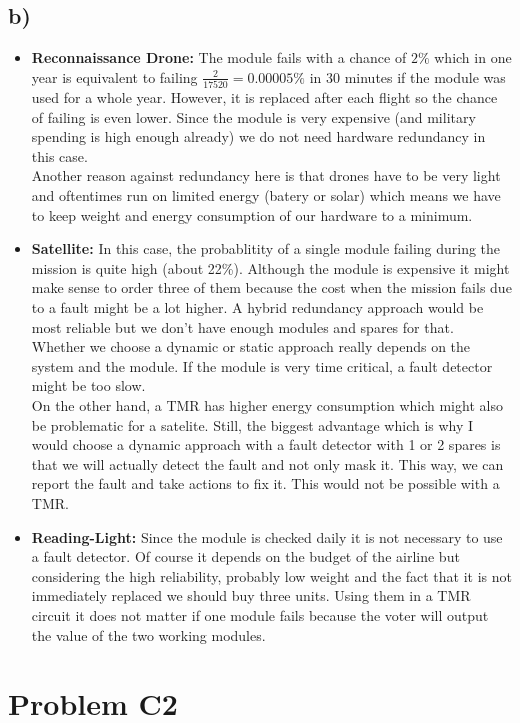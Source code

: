 \documentclass[12pt]{article}
\begin{document}
\subsection*{b)}
\begin{itemize}
\item \textbf{Reconnaissance Drone:} The module fails with a chance of $2\%$ which in one year is equivalent to failing $\frac{2}{17520} = 0.00005\%$ in 30 minutes if the module was used for a whole year. However, it is replaced after each flight so the chance of failing is even lower. Since the module is very expensive (and military spending is high enough already) we do not need hardware redundancy in this case.\\
Another reason against redundancy here is that drones have to be very light and oftentimes run on limited energy (batery or solar) which means we have to keep weight and energy consumption of our hardware to a minimum.
\item \textbf{Satellite:} In this case, the probablitity of a single module failing during the mission is quite high (about 22\%). Although the module is expensive it might make sense to order three of them because the cost when the mission fails due to a fault might be a lot higher. A hybrid redundancy approach would be most reliable but we don't have enough modules and spares for that.\\
Whether we choose a dynamic or static approach really depends on the system and the module. If the module is very time critical, a fault detector might be too slow. \\
On the other hand, a TMR has higher energy consumption which might also be problematic for a satelite. Still, the biggest advantage which is why I would choose a dynamic approach with a fault detector with 1 or 2 spares is that we will actually detect the fault and not only mask it. This way, we can report the fault and take actions to fix it. This would not be possible with a TMR.
\item \textbf{Reading-Light:} Since the module is checked daily it is not necessary to use a fault detector. Of course it depends on the budget of the airline but considering the high reliability, probably low weight and the fact that it is not immediately replaced we should buy three units. Using them in a TMR circuit it does not matter if one module fails because the voter will output the value of the two working modules.
\end{itemize}
\section*{Problem C2}
\end{document}
